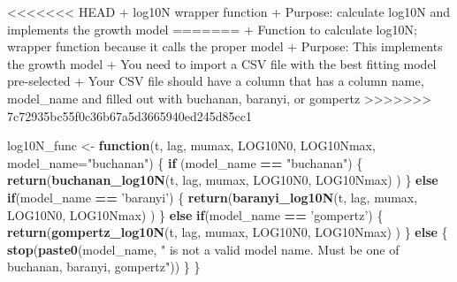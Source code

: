 \documentclass[]{article}
\newenvironment{Shaded}{\begin{snugshade}}{\end{snugshade}}
\newcommand{\ControlFlowTok}[1]{\textcolor[rgb]{0.13,0.29,0.53}{\textbf{#1}}}
\newcommand{\DataTypeTok}[1]{\textcolor[rgb]{0.13,0.29,0.53}{#1}}
\newcommand{\KeywordTok}[1]{\textcolor[rgb]{0.13,0.29,0.53}{\textbf{#1}}}
\newcommand{\NormalTok}[1]{#1}
\newcommand{\OperatorTok}[1]{\textcolor[rgb]{0.81,0.36,0.00}{\textbf{#1}}}
\newcommand{\StringTok}[1]{\textcolor[rgb]{0.31,0.60,0.02}{#1}}
\begin{document}
\textless{}\textless{}\textless{}\textless{}\textless{}\textless{}\textless{}
HEAD + log10N wrapper function + Purpose: calculate log10N and
implements the growth model ======= + Function to calculate log10N;
wrapper function because it calls the proper model + Purpose: This
implements the growth model + You need to import a CSV file with the
best fitting model pre-selected + Your CSV file should have a column
that has a column name, model\_name and filled out with buchanan,
baranyi, or gompertz
\textgreater{}\textgreater{}\textgreater{}\textgreater{}\textgreater{}\textgreater{}\textgreater{}
7c72935bc55f0c36b67a5d3665940ed245d85cc1

\begin{Shaded}
\begin{Highlighting}[]
\NormalTok{log10N_func <-}\StringTok{ }\ControlFlowTok{function}\NormalTok{(t, lag, mumax, LOG10N0, LOG10Nmax, }\DataTypeTok{model_name=}\StringTok{"buchanan"}\NormalTok{) \{}
  \ControlFlowTok{if}\NormalTok{ (model_name }\OperatorTok{==}\StringTok{ "buchanan"}\NormalTok{) \{}
    \KeywordTok{return}\NormalTok{(}\KeywordTok{buchanan_log10N}\NormalTok{(t, lag, mumax, LOG10N0, LOG10Nmax) )}
\NormalTok{  \}}
  \ControlFlowTok{else} \ControlFlowTok{if}\NormalTok{(model_name }\OperatorTok{==}\StringTok{ 'baranyi'}\NormalTok{) \{}
    \KeywordTok{return}\NormalTok{(}\KeywordTok{baranyi_log10N}\NormalTok{(t, lag, mumax, LOG10N0, LOG10Nmax) )}
\NormalTok{  \}}
  \ControlFlowTok{else} \ControlFlowTok{if}\NormalTok{(model_name }\OperatorTok{==}\StringTok{ 'gompertz'}\NormalTok{) \{}
    \KeywordTok{return}\NormalTok{(}\KeywordTok{gompertz_log10N}\NormalTok{(t, lag, mumax, LOG10N0, LOG10Nmax) )}
\NormalTok{  \}}
  \ControlFlowTok{else}\NormalTok{ \{}
    \KeywordTok{stop}\NormalTok{(}\KeywordTok{paste0}\NormalTok{(model_name, }\StringTok{" is not a valid model name. Must be one of buchanan, baranyi, gompertz"}\NormalTok{))}
\NormalTok{  \}}
\NormalTok{\}}
\end{Highlighting}
\end{Shaded}
\end{document}
